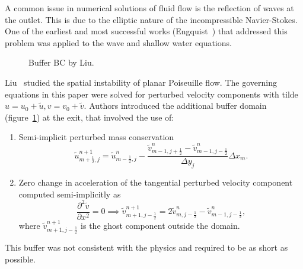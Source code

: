 \documentclass{article}
\begin{document}
A common issue in numerical solutions of fluid flow is the reflection of waves at the outlet. This is due to the elliptic nature of the incompressible Navier-Stokes. One of the earliest and most successful works (Engquist~\cite{Engquist:1977}) that addressed this problem was applied to the wave and shallow water equations. 
\begin{figure}[H] %
  \caption{Buffer BC by Liu.}\label{fig:BC-buffer}
\end{figure}
Liu~\cite{Liu:1993} studied the spatial instability of planar Poiseuille flow. The governing equations in this paper were solved for perturbed velocity components with tilde $u=u_0+\tilde{u},v=v_0+\tilde{v}$. Authors introduced the additional buffer domain (figure~\ref{fig:BC-buffer}) at the exit, that involved the use of:
\begin{enumerate}
	\item Semi-implicit perturbed mass conservation
	\begin{equation}
		\tilde{u}_{m+\frac{1}{2},j}^{n+1}=\tilde{u}_{m-\frac{1}{2},j}^n-\frac{\tilde{v}^n_{m-1,j+\frac{1}{2}}-\tilde{v}^n_{m-1,j-\frac{1}{2}}}{\Delta y_{j}}{\Delta x_m}.
	\end{equation}
	\item Zero change in acceleration of the tangential perturbed velocity component computed semi-implicitly as
	\begin{equation}
		\frac{\partial ^2 \tilde{v}}{\partial x^2}=0\implies \tilde{v}^{n+1}_{m+1,j-\frac{1}{2}}=2\tilde{v}^n_{m,j-\frac{1}{2}}-\tilde{v}^n_{m-1,j-\frac{1}{2}},
	\end{equation}
	where $\tilde{v}^{n+1}_{m+1,j-\frac{1}{2}}$ is the ghost component outside the domain.
\end{enumerate}
This buffer was not consistent with the physics and required to be as short as possible. 
\end{document}
